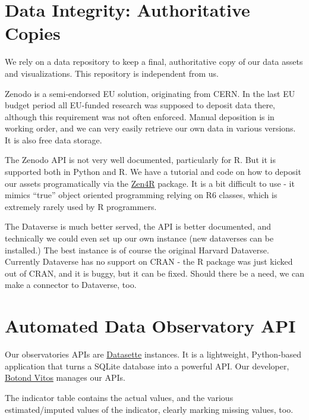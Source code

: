 \documentclass[
  a4paper,
  openany, a4paper, oneside]{book}
\begin{document}
\hypertarget{zenodo}{%
\section{Data Integrity: Authoritative Copies}\label{zenodo}}

We rely on a data repository to keep a final, authoritative copy of our data assets and visualizations. This repository is independent from us.

Zenodo is a semi-endorsed EU solution, originating from CERN. In the last EU budget period all EU-funded research was supposed to deposit data there, although this requirement was not often enforced. Manual deposition is in working order, and we can very easily retrieve our own data in various versions. It is also free data storage.

The Zenodo API is not very well documented, particularly for R. But it is supported both in Python and R. We have a tutorial and code on how to deposit our assets programatically via the \href{https://github.com/eblondel/zen4R/wiki}{Zen4R} package. It is a bit difficult to use - it mimics ``true'' object oriented programming relying on R6 classes, which is extremely rarely used by R programmers.

The Dataverse is much better served, the API is better documented, and technically we could even set up our own instance (new dataverses can be installed.) The best instance is of course the original Harvard Dataverse. Currently Dataverse has no support on CRAN - the R package was just kicked out of CRAN, and it is buggy, but it can be fixed. Should there be a need, we can make a connector to Dataverse, too.

\hypertarget{api}{%
\section{Automated Data Observatory API}\label{api}}

Our observatories APIs are \href{https://datasette.io/}{Datasette} instances. It is a lightweight, Python-based application that turns a SQLite database into a powerful API. Our developer, \href{https://music.dataobservatory.eu/author/botond-vitos/}{Botond Vitos} manages our APIs.

The indicator table contains the actual values, and the various estimated/imputed values of the indicator, clearly marking missing values, too.
\end{document}
